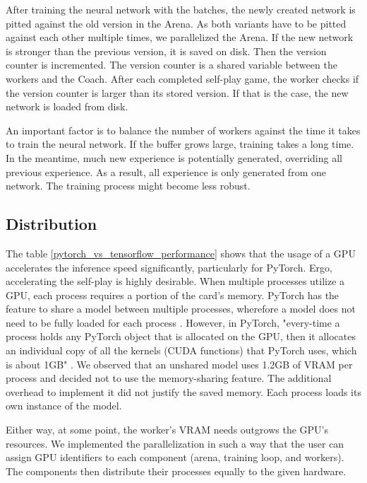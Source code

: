 After training the neural network with the batches, the newly created network is pitted against the old version in the Arena. As both variants have to be pitted against each other multiple times, we parallelized the Arena. If the new network is stronger than the previous version, it is saved on disk. Then the version counter is incremented. The version counter is a shared variable between the workers and the Coach. After each completed self-play game, the worker checks if the version counter is larger than its stored version. If that is the case, the new network is loaded from disk.

An important factor is to balance the number of workers against the time it takes to train the neural network. If the buffer grows large, training takes a long time. In the meantime, much new experience is potentially generated, overriding all previous experience. As a result, all experience is only generated from one network. The training process might become less robust.

\subsection{Distribution}
The table \ref{pytorch_vs_tensorflow_performance} shows that the usage of a GPU accelerates the inference speed significantly, particularly for PyTorch. Ergo, accelerating the self-play is highly desirable. When multiple processes utilize a GPU, each process requires a portion of the card's memory. PyTorch has the feature to share a model between multiple processes, wherefore a model does not need to be fully loaded for each process \cite{noauthor_module_nodate}. However, in PyTorch, "every-time a process holds any PyTorch object that is allocated on the GPU, then it allocates an individual copy of all the kernels (CUDA functions) that PyTorch uses, which is about 1GB" \cite{radim_shark_sharing_2020}. We observed that an unshared model uses 1.2GB of VRAM per process and decided not to use the memory-sharing feature. The additional overhead to implement it did not justify the saved memory. Each process loads its own instance of the model.

Either way, at some point, the worker's VRAM needs outgrows the GPU's resources. We implemented the parallelization in such a way that the user can assign GPU identifiers to each component (arena, training loop, and workers). The components then distribute their processes equally to the given hardware.

